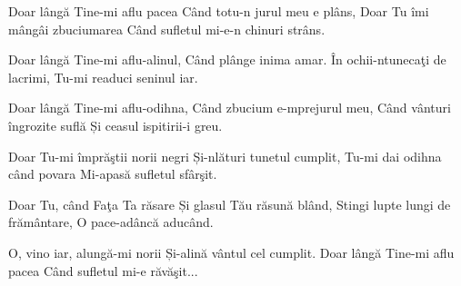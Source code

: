 
\beginverse
Doar lângă Tine-mi aflu pacea
Când totu-n jurul meu e plâns,
Doar Tu îmi mângâi zbuciumarea
Când sufletul mi-e-n chinuri strâns.
\endverse

\beginchorus
Doar lângă Tine-mi aflu-alinul,
Când plânge inima amar.
În ochii-ntunecaţi de lacrimi,
Tu-mi readuci seninul iar.
\endchorus

\beginverse
Doar lângă Tine-mi aflu-odihna,
Când zbucium e-mprejurul meu,
Când vânturi îngrozite suflă
Și ceasul ispitirii-i greu.
\endverse

\beginchorus
Doar Tu-mi împrăştii norii negri
Și-nlături tunetul cumplit,
Tu-mi dai odihna când povara
Mi-apasă sufletul sfârşit.
\endchorus

\beginverse
Doar Tu, când Faţa Ta răsare
Și glasul Tău răsună blând,
Stingi lupte lungi de frământare,
O pace-adâncă aducând.
\endverse

\beginchorus
O, vino iar, alungă-mi norii
Și-alină vântul cel cumplit.
Doar lângă Tine-mi aflu pacea
Când sufletul mi-e răvăşit...
\endchorus

\endsong

